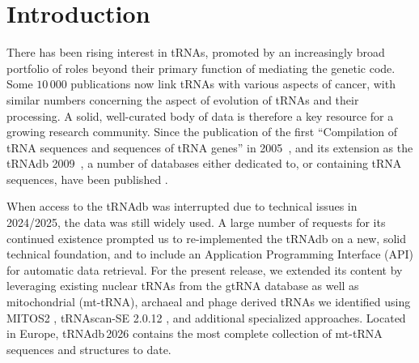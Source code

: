 \documentclass[unnumsec,webpdf,contemporary,large]{oup-authoring-template}
\newcommand{\TODO}[1]{\begingroup\color{red}#1\endgroup}
\begin{document}
%


\maketitle

\section{Introduction}

There has been rising interest in tRNAs, promoted by an increasingly broad
portfolio of roles beyond their primary function of mediating the genetic
code. Some $10\,000$ publications now link tRNAs with various aspects of
cancer, with similar numbers concerning the aspect of evolution of tRNAs
and their processing.  A solid, well-curated body of data is therefore a
key resource for a growing research community.  Since the publication of
the first ``Compilation of tRNA sequences and sequences of tRNA genes'' in
2005~\cite{sprinzl:2005}, and its extension as the tRNAdb
2009~\cite{juehling:2009}, a number of databases either dedicated to, or
containing tRNA sequences, have been published \cite{gtrnadb, trnadb-ce,
  modomics}.

When access to the tRNAdb was interrupted due to technical issues in
2024/2025, the data was still widely used. A large number of requests for
its continued existence prompted us to re-implemented the tRNAdb on a new,
solid technical foundation, and to include an Application Programming
Interface (API) for automatic data retrieval. For the present release, we
extended its content by leveraging existing nuclear tRNAs from the gtRNA
database as well as mitochondrial \TODO{(mt-tRNA)}, archaeal and phage derived tRNAs we
identified using MITOS2 \cite{mitos2}, tRNAscan-SE 2.0.12 \cite{tRNAscan},
and additional specialized approaches. \TODO{Located in Europe, tRNAdb\,2026
 contains the most complete collection of mt-tRNA sequences and structures to date.}
\end{document}
